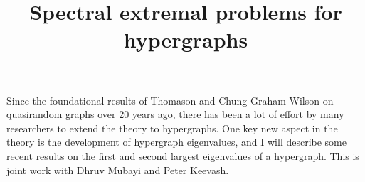 \title{Spectral extremal problems for hypergraphs}
\endtitle

Since the foundational results of Thomason and Chung-Graham-Wilson on
quasirandom graphs over 20 years ago, there has been a lot of effort by many
researchers to extend the theory to hypergraphs. One key new aspect in the
theory is the development of hypergraph eigenvalues, and I will describe 
some recent results on the first and second largest eigenvalues of a hypergraph.
This is joint work with Dhruv Mubayi and Peter Keevash.